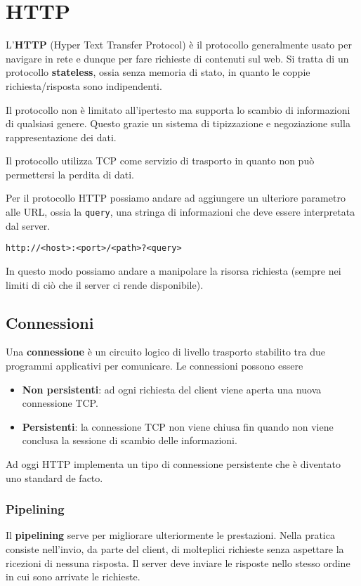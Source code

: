 \section{HTTP}
L'\textbf{HTTP} (Hyper Text Transfer Protocol) è il protocollo generalmente usato per navigare in
rete e dunque per fare richieste di contenuti sul web. Si tratta di un protocollo
\textbf{stateless}, ossia senza memoria di stato, in quanto le coppie richiesta/risposta sono
indipendenti.

Il protocollo non è limitato all'ipertesto ma supporta lo scambio di informazioni di qualsiasi 
genere. Questo grazie un sistema di tipizzazione e negoziazione sulla rappresentazione dei dati.

Il protocollo utilizza TCP come servizio di trasporto in quanto non può permettersi la perdita di
dati.

Per il protocollo HTTP possiamo andare ad aggiungere un ulteriore parametro alle URL, ossia la
\verb|query|, una stringa di informazioni che deve essere interpretata dal server.
\begin{center} \verb|http://<host>:<port>/<path>?<query>| \end{center}
In questo modo possiamo andare a manipolare la risorsa richiesta (sempre nei limiti di ciò che il
server ci rende disponibile).

\subsection{Connessioni}
Una \textbf{connessione} è un circuito logico di livello trasporto stabilito tra due programmi
applicativi per comunicare. Le connessioni possono essere
\begin{itemize}
	\item \textbf{Non persistenti}: ad ogni richiesta del client viene aperta una nuova connessione
		TCP.
	\item \textbf{Persistenti}: la connessione TCP non viene chiusa fin quando non viene conclusa 
		la sessione di scambio delle informazioni.
\end{itemize}
Ad oggi HTTP implementa un tipo di connessione persistente che è diventato uno standard de facto.

\subsubsection{Pipelining}
Il \textbf{pipelining} serve per migliorare ulteriormente le prestazioni. Nella pratica consiste 
nell'invio, da parte del client, di molteplici richieste senza aspettare la ricezioni di nessuna
risposta. Il server deve inviare le risposte nello stesso ordine in cui sono arrivate le richieste.

